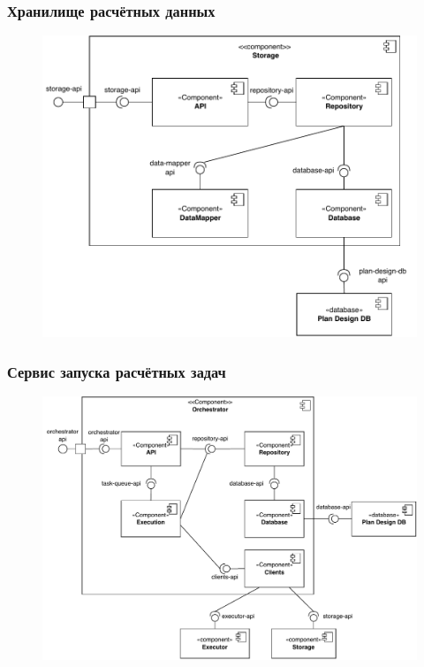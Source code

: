 \begin{frame}
\frametitle{Хранилище расчётных данных}
\begin{figure}
    \includegraphics[scale=.55]{pictures/architecture/storage_component_common}
\end{figure}
\end{frame}

\begin{frame}
\frametitle{Сервис запуска расчётных задач}
\begin{figure}
    \includegraphics[scale=.5]{pictures/architecture/orchestrator_component_common}
\end{figure}
\end{frame}


